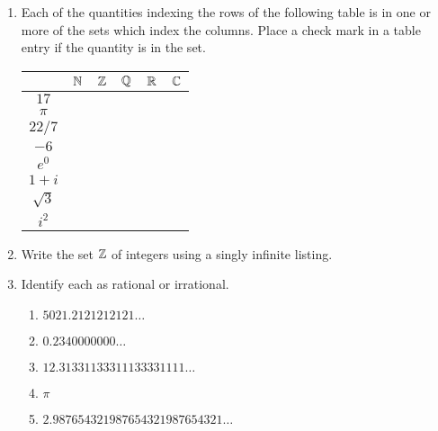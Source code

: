 \begin{enumerate}

\item Each of the quantities indexing the rows of the following table
is in one or more of the sets which index the columns.  Place a 
check mark in a table entry if the quantity is in the set.

\begin{tabular}{|c||c|c|c|c|c|} \hline
 & ${\mathbb N}$ & ${\mathbb Z}$ & ${\mathbb Q}$ & ${\mathbb R}$ & ${\mathbb C}$
 \\ \hline\hline
\rule{0pt}{15pt} $17$ & & & & & \\ \hline
\rule{0pt}{15pt} $\pi$ & & & & & \\ \hline
\rule{0pt}{15pt} $22/7$ & & & & & \\ \hline
\rule{0pt}{15pt} $-6$ & & & & & \\ \hline
\rule{0pt}{15pt} $e^0$ & & & & & \\ \hline
\rule{0pt}{15pt} $1+i$ & & & & & \\ \hline
\rule{0pt}{15pt} $\sqrt{3}$ & & & & & \\ \hline
\rule{0pt}{15pt} $i^2$ & & & & & \\  \hline
\end{tabular}


\vfill

\workbookpagebreak

\item Write the set ${\mathbb Z}$ of integers using a singly infinite
listing.

\vfill


\item Identify each as rational or irrational.
\begin{enumerate}
\item $5021.2121212121\ldots$
\item $0.2340000000\ldots$
\item $12.31331133311133331111\ldots$
\item $\pi$
\item $2.987654321987654321987654321\ldots$
\end{enumerate}

\vfill

\textbookpagebreak


\end{enumerate}
